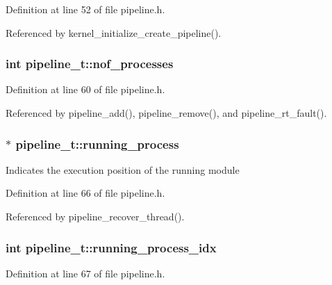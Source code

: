 Definition at line 52 of file pipeline.\-h.



Referenced by kernel\-\_\-initialize\-\_\-create\-\_\-pipeline().

\subsubsection[{nof\-\_\-processes}]{\setlength{\rightskip}{0pt plus 5cm}int pipeline\-\_\-t\-::nof\-\_\-processes}\label{structpipeline__t_af1260ecb0c7e3429f031708d1eebaf04}


Definition at line 60 of file pipeline.\-h.



Referenced by pipeline\-\_\-add(), pipeline\-\_\-remove(), and pipeline\-\_\-rt\-\_\-fault().

\subsubsection[{running\-\_\-process}]{$\ast$ pipeline\-\_\-t\-::running\-\_\-process}\label{structpipeline__t_a8c842f2d27e3f3a3ff933d5a2ee409fa}
Indicates the execution position of the running module 

Definition at line 66 of file pipeline.\-h.



Referenced by pipeline\-\_\-recover\-\_\-thread().

\subsubsection[{running\-\_\-process\-\_\-idx}]{\setlength{\rightskip}{0pt plus 5cm}int pipeline\-\_\-t\-::running\-\_\-process\-\_\-idx}\label{structpipeline__t_a09b2f4bb610224e4f5c9ddcbf81b7874}


Definition at line 67 of file pipeline.\-h.



